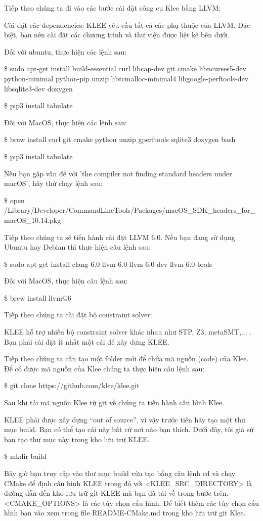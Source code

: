 \documentclass[12pt,a4paper]{article}
\begin{document}
Tiếp theo chúng ta đi vào các bước cài đặt công cụ Klee bằng LLVM:

Cài đặt các dependencies: KLEE yêu cầu tất cả các phụ thuộc của LLVM. Đặc biệt, bạn nên cài đặt các chương trình và thư viện được liệt kê bên dưới.

Đối với ubuntu, thực hiện các lệnh sau:

\$ sudo apt-get install build-essential curl libcap-dev git cmake libncurses5-dev python-minimal python-pip unzip libtcmalloc-minimal4 libgoogle-perftools-dev libsqlite3-dev doxygen

\$ pip3 install tabulate

Đối với MacOS, thực hiện các lệnh sau:

\$ brew install curl git cmake python unzip gperftools sqlite3 doxygen bash

\$ pip3 install tabulate

Nếu bạn gặp vấn đề với 'the compiler not finding standard headers under macOS', hãy thử chạy lệnh sau:

\$ open /Library/Developer/CommandLineTools/Packages/macOS\_SDK\_headers\_for\_macOS\_10.14.pkg

Tiếp theo chúng ta sẽ tiến hành cài đặt LLVM 6.0. Nếu bạn đang sử dụng Ubuntu hay Debian thì thực hiện câu lệnh sau:

\$ sudo apt-get install clang-6.0 llvm-6.0 llvm-6.0-dev llvm-6.0-tools

Đối với MacOS, thực hiện câu lệnh sau:

\$ brew install llvm@6

Tiếp theo chúng ta cài đặt bộ constraint solver:

KLEE hỗ trợ nhiều bộ constraint solver khác nhau như STP, Z3, metaSMT,... . Bạn phải cài đặt ít nhất một cái để xây dựng KLEE.

Tiếp theo chúng ta cần tạo một folder mới để chứa mã nguồn (code) của Klee. Để có được mã nguồn của Klee chúng ta thực hiện câu lệnh sau:

\$ git clone https://github.com/klee/klee.git

Sau khi tải mã nguồn Klee từ git về chúng ta tiến hành cấu hình Klee.

KLEE phải được xây dựng “out of source”, vì vậy trước tiên hãy tạo một thư mục build. Bạn có thể tạo cái này bất cứ nơi nào bạn thích. Dưới đây, tôi giả sử bạn tạo thư mục này trong kho lưu trữ KLEE.

\$ mkdir build

Bây giờ bạn truy cập vào thư mục build vừa tạo bằng câu lệnh cd và chạy CMake để định cấu hình KLEE trong đó với <KLEE\_SRC\_DIRECTORY> là đường dẫn đến kho lưu trữ git KLEE mà bạn đã tải về trong bước trên. <CMAKE\_OPTIONS> là các tùy chọn cấu hình. Để biết thêm các tùy chọn cấu hình bạn vào xem trong file README-CMake.md trong kho lưu trữ git Klee.
\end{document}
